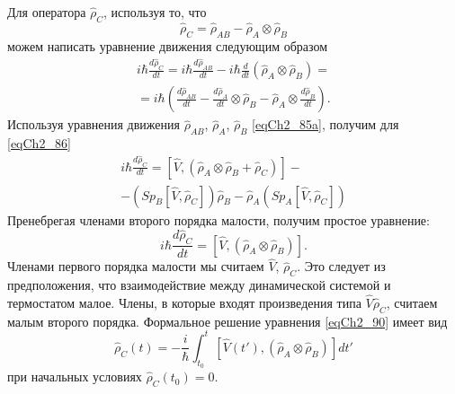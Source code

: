 Для оператора $\hat{\rho}_C$,  используя то, что  
\[
\hat{\rho}_C = \hat{\rho}_{AB} - \hat{\rho}_A \otimes \hat{\rho}_B
\]
можем написать уравнение движения следующим образом
\begin{eqnarray}
i \hbar \frac{d \hat{\rho}_C}{d t} = i \hbar \frac{d
  \hat{\rho}_{AB}}{d t} - i \hbar 
\frac{d}{d t} \left(\hat{\rho}_A \otimes \hat{\rho}_B\right) = 
\nonumber \\
= i \hbar
\left(
\frac{d \hat{\rho}_{AB}}{d t} -
\frac{d \hat{\rho}_{A}}{d t} \otimes \hat{\rho}_{B} - 
\hat{\rho}_{A} \otimes \frac{d \hat{\rho}_{B}}{d t}
\right).
\label{eqCh2_86}
\end{eqnarray}
Используя уравнения движения $\hat{\rho}_{AB}$, $\hat{\rho}_{A}$,
$\hat{\rho}_{B}$  \eqref{eqCh2_85a},  получим для \eqref{eqCh2_86} 
\begin{eqnarray}
i \hbar \frac{d \hat{\rho}_C}{d t} = 
\left[\hat{V}, \left(\hat{\rho}_A \otimes \hat{\rho}_B +
  \hat{\rho}_{C}\right)\right] - 
\nonumber \\
- 
\left(Sp_B\left[\hat{V}, \hat{\rho}_C\right]\right)\hat{\rho}_B -
\hat{\rho}_A \left(Sp_A\left[\hat{V}, \hat{\rho}_C\right]\right)
\label{eqCh2_89}
\end{eqnarray}
Пренебрегая членами второго порядка малости, получим простое уравнение:
\begin{equation}
i \hbar \frac{d \hat{\rho}_C}{d t} = 
\left[\hat{V}, \left(\hat{\rho}_A \otimes \hat{\rho}_B\right)\right]. 
\label{eqCh2_90}
\end{equation}
Членами первого порядка малости мы считаем $\hat{V}$, $\hat{\rho}_C$.
Это следует из предположения, что взаимодействие между динамической
системой и термостатом малое. Члены, в которые входят произведения
типа  $\hat{V}\hat{\rho}_C$, считаем малым второго порядка. Формальное
решение уравнения \eqref{eqCh2_90} имеет вид  
\begin{equation}
\hat{\rho}_C\left(t\right) = - \frac{i}{\hbar}\int_{t_0}^t
\left[\hat{V}\left(t'\right), \left(\hat{\rho}_A \otimes
  \hat{\rho}_B\right)\right] dt' 
\label{eqCh2_91}
\end{equation}
при начальных условиях $\hat{\rho}_C\left(t_0\right) = 0$. 

